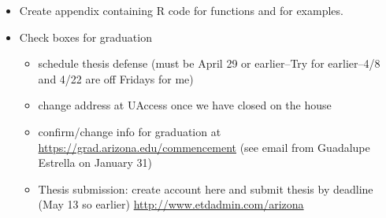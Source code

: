 \documentclass[12pt, a4paper]{article}
\begin{document}
\begin{itemize}
  \item Create appendix containing R code for functions and for examples.
  \item Check boxes for graduation
  \begin{itemize}
    \item schedule thesis defense (must be April 29 or earlier--Try for earlier--4/8 and 4/22 are off Fridays for me)
    \item change address at UAccess once we have closed on the house
    \item confirm/change info for graduation at \url{https://grad.arizona.edu/commencement} (see email from Guadalupe Estrella on January 31)
    \item Thesis submission:  create account here and submit thesis by deadline (May 13 so earlier) \url{http://www.etdadmin.com/arizona}
  \end{itemize}
\end{itemize}
\end{document}
